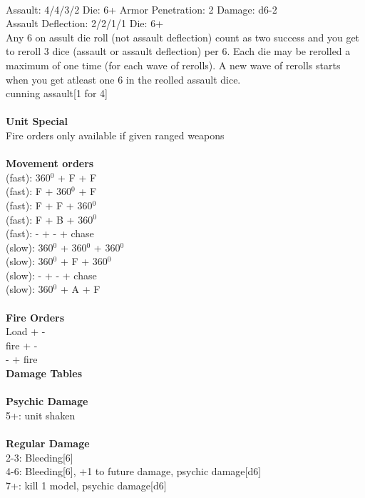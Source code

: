 \ \\
Assault: 4/4/3/2 Die: 6+ Armor Penetration: 2 Damage: d6-2 \\
Assault Deflection: 2/2/1/1 Die: 6+\\
\indent Any 6 on assult die roll (not assault deflection) count as two success and you get to reroll 3 dice (assault or assault deflection) per 6. Each die may be rerolled a maximum of one time (for each wave of rerolls). A new wave of rerolls starts when you get atleast one 6 in the reolled assault dice.\\ cunning assault[1 for 4] \\
\ \\

{\bf Unit Special} \\
Fire orders only available if given ranged weapons
\ \\


\ \\ {\bf Movement orders } \\
(fast): 360$^0$ + F + F \\
(fast): F + 360$^0$ + F \\
(fast): F + F + 360$^0$ \\
(fast): F + B + 360$^0$ \\
(fast): - + - + chase \\
(slow): 360$^0$ + 360$^0$ + 360$^0$ \\
(slow): 360$^0$ + F + 360$^0$ \\
(slow): - + - + chase \\
(slow): 360$^0$ + A + F \\
\ \\ {\bf Fire Orders } \\
Load + - \\
fire + - \\
- + fire \\



{\bf Damage Tables} \\
\ \\ {\bf Psychic Damage } \\
5+: unit shaken \\
\ \\ {\bf Regular Damage } \\
2-3: Bleeding[6] \\
4-6: Bleeding[6], +1 to future damage, psychic damage[d6] \\
7+: kill 1 model, psychic damage[d6] \\


